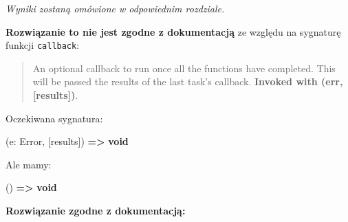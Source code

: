 \documentclass[11pt]{article}
\newenvironment{Shaded}{}{}
\newcommand{\KeywordTok}[1]{\textcolor[rgb]{0.00,0.44,0.13}{\textbf{{#1}}}}
\newcommand{\NormalTok}[1]{{#1}}
\newcommand{\OperatorTok}[1]{\textcolor[rgb]{0.40,0.40,0.40}{{#1}}}
\newcommand{\BuiltInTok}[1]{{#1}}
\begin{document}
\emph{Wyniki zostaną omówione w odpowiednim rozdziale.}

\textbf{Rozwiązanie to nie jest zgodne z dokumentacją} ze względu na
sygnaturę funkcji \texttt{callback}:

\begin{quote}
An optional callback to run once all the functions have completed. This
will be passed the results of the last task's callback. \textbf{Invoked
with (err, {[}results{]})}.
\end{quote}

Oczekiwana sygnatura:

\begin{Shaded}
\begin{Highlighting}[]
\NormalTok{(e}\OperatorTok{:} \BuiltInTok{Error}\OperatorTok{,}\NormalTok{ [results]) }\KeywordTok{=\textgreater{}} \KeywordTok{void}
\end{Highlighting}
\end{Shaded}

Ale mamy:

\begin{Shaded}
\begin{Highlighting}[]
\NormalTok{() }\KeywordTok{=\textgreater{}} \KeywordTok{void}
\end{Highlighting}
\end{Shaded}

    \textbf{Rozwiązanie zgodne z dokumentacją:}
\end{document}

